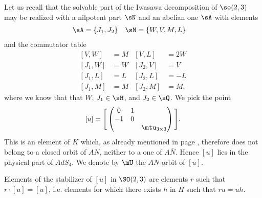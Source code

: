 Let us recall that the solvable part of the Iwasawa decomposition of $\so(2,3)$ may be realized with a nilpotent part $\sN$ and an abelian one $\sA$  with elements
\begin{subequations}
\begin{align} 
\sA&=\{ J_1, J_2\}	&\sN&=\{W,V,M,L\}
\end{align}
\end{subequations}
and the commutator table 
\begin{subequations}	\label{EqTableRappelSO}
\begin{align}
[V,W]&=M &[V,L]&=2W\\
[ J_1,W]&=W       &[ J_2,V]&=V\\
[ J_1,L]&=L           &[ J_2,L]&=-L\\
[ J_1,M]&=M           &[ J_2,M]&=M,
\end{align}
\end{subequations}
where we know that that $W$, $J_{1}\in\sH$, and $J_{2}\in\sQ$. We pick the point
\[
  [u]=
\Bigg[
\begin{pmatrix}
0&1\\
-1&0\\
&&\mtu_{3\times 3}
\end{pmatrix}
\Bigg].
\]
This is an element of $K$ which, as already mentioned in page \pageref{PgNoticeKpassung}, therefore does not belong to a closed orbit of $AN$, neither to a one of $A\bar N$. Hence $[u]$ lies in the physical part of $AdS_4$. We denote by $\mU$ the $AN$-orbit of $[u]$.

Elements of the stabilizer of $[u]$ in $\SO(2,3)$ are elements $r$ such that $r\cdot[u]=[u]$, i.e. elements for which there exists  $h$ in $H$ such that $ru=uh$.

